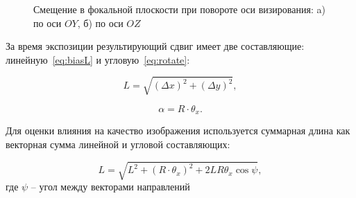 \begin{figure}[h!]
\begin{minipage}[b][][b]{0.49\linewidth}
 	\end{minipage}
 	\caption{Смещение в фокальной плоскости при повороте оси визирования: a) по оси $OY$, б) по оси $OZ$ }
 	\label{fig:bias}
 \end{figure}
 
 
 За время экспозиции результирующий сдвиг имеет две составляющие: линейную~\eqref{eq:biasL} и угловую~\eqref{eq:rotate}:
 
 \begin{equation}
 	\label{eq:biasL}
 	L=\sqrt{(\Delta x)^2+(\Delta y)^2},
 \end{equation}
 
 \begin{equation}
 	\label{eq:rotate}
 	\alpha = R \cdot \theta_x.
 \end{equation}
 
 
 Для оценки влияния на качество изображения используется суммарная длина  как векторная сумма линейной и угловой составляющих:
 
 \begin{equation}
 	\label{eq:L_total}
 	L = \sqrt{L^2 + (R\cdot \theta_x)^2 + 2LR\theta_x\cos{\psi}},
 \end{equation}
 где \(\psi\) -- угол между векторами направлений 
 
